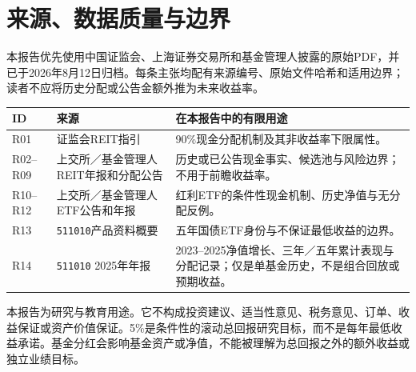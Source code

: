 \section{来源、数据质量与边界}

本报告优先使用中国证监会、上海证券交易所和基金管理人披露的原始PDF，并已于2026年8月12日归档。每条主张均配有来源编号、原始文件哈希和适用边界；读者不应将历史分配或公告金额外推为未来收益率。

\begin{longtable}{p{1.1cm}p{3.4cm}p{5.7cm}}
\toprule
\textbf{ID} & \textbf{来源} & \textbf{在本报告中的有限用途} \\
\midrule
R01 & 证监会REIT指引 & 90\%现金分配机制及其非收益率下限属性。 \\
R02--R09 & 上交所／基金管理人REIT年报和分配公告 & 历史或已公告现金事实、候选池与风险边界；不用于前瞻收益率。 \\
R10--R12 & 上交所／基金管理人ETF公告和年报 & 红利ETF的条件性现金机制、历史净值与无分配反例。 \\
R13 & \texttt{511010}产品资料概要 & 五年国债ETF身份与不保证最低收益的边界。 \\
R14 & \texttt{511010} 2025年年报 & 2023--2025净值增长、三年／五年累计表现与分配记录；仅是单基金历史，不是组合回放或预期收益。 \\
\bottomrule
\end{longtable}


\begin{disclosurebox}[重要披露]
\footnotesize
本报告为研究与教育用途。它不构成投资建议、适当性意见、税务意见、订单、收益保证或资产价值保证。5\%是条件性的滚动总回报研究目标，而不是每年最低收益承诺。基金分红会影响基金资产或净值，不能被理解为总回报之外的额外收益或独立业绩目标。
\end{disclosurebox}
